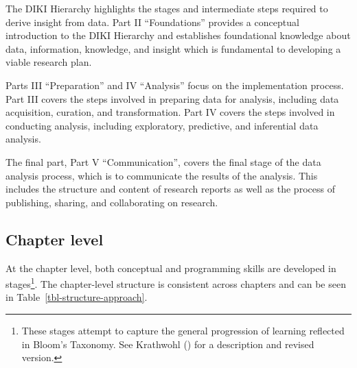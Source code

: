\documentclass[
  letterpaper,
]{latex/krantz}
\theoremstyle{definition}
\theoremstyle{remark}
\begin{document}
The DIKI Hierarchy highlights the stages and intermediate steps required
to derive insight from data. Part II ``Foundations'' provides a
conceptual introduction to the DIKI Hierarchy and establishes
foundational knowledge about data, information, knowledge, and insight
which is fundamental to developing a viable research plan.

Parts III ``Preparation'' and IV ``Analysis'' focus on the
implementation process. Part III covers the steps involved in preparing
data for analysis, including data acquisition, curation, and
transformation. Part IV covers the steps involved in conducting
analysis, including exploratory, predictive, and inferential data
analysis.

The final part, Part V ``Communication'', covers the final stage of the
data analysis process, which is to communicate the results of the
analysis. This includes the structure and content of research reports as
well as the process of publishing, sharing, and collaborating on
research.

\subsection*{Chapter level}\label{sec-preface-structure-chapter}

At the chapter level, both conceptual and programming skills are
developed in stages\footnote{These stages attempt to capture the general
  progression of learning reflected in Bloom's Taxonomy. See Krathwohl
  () for a description and revised
  version.}. The chapter-level structure is consistent across chapters
and can be seen in Table~\ref{tbl-structure-approach}.
\end{document}
